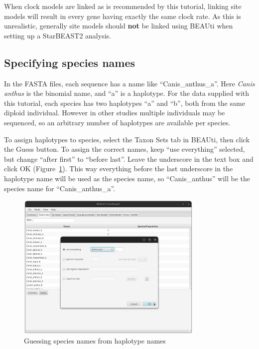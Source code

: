 \documentclass[12pt]{article}
\begin{document}
\begin{tcolorbox}[colback=purple!5,colframe=purple!40!black,title=Linking site models]
When clock models are linked as is recommended by this tutorial, linking site models will result in every gene having exactly the same
clock rate. As this is unrealistic, generally site models should \textbf{not}
be linked using BEAUti when setting up a StarBEAST2 analysis.
\end{tcolorbox}

\subsection{Specifying species names}
\label{subsec:speciesNames}

In the FASTA files, each sequence has a name like ``Canis\_anthus\_a''.
Here \textit{Canis anthus} is the binomial name, and ``a'' is a haplotype.
For the data supplied with this tutorial, each species has two haplotypes ``a'' and ``b'', both from
the same diploid individual. However in other studies multiple individuals may
be sequenced, so an arbitrary number of haplotypes are available per species.

To assign haplotypes to species, select the Taxon Sets tab in BEAUti, then
click the Guess button. To assign the correct names, keep ``use everything''
selected, but change ``after first'' to ``before last''. Leave the underscore
in the text box and click OK (Figure~\ref{fig:guessTaxonMap}). This way everything before
the last underscore in the haplotype name will be used as the species name,
so ``Canis\_anthus'' will be the species name for ``Canis\_anthus\_a''.

\begin{figure}[htb!]
\centering
\includegraphics[width=0.8\textwidth]{figures/guessTaxonMap.png}
\caption
{Guessing species names from haplotype names}
\label{fig:guessTaxonMap}
\end{figure}
\end{document}
